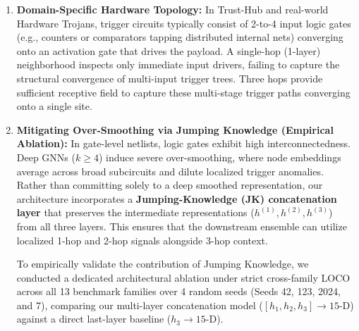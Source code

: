 \documentclass[11pt,a4paper]{article}
\begin{document}
\begin{enumerate}[leftmargin=*]
    \item \textbf{Domain-Specific Hardware Topology:} In Trust-Hub and real-world Hardware Trojans, trigger circuits typically consist of 2-to-4 input logic gates (e.g., counters or comparators tapping distributed internal nets) converging onto an activation gate that drives the payload. A single-hop (1-layer) neighborhood inspects only immediate input drivers, failing to capture the structural convergence of multi-input trigger trees. Three hops provide sufficient receptive field to capture these multi-stage trigger paths converging onto a single site.

    \item \textbf{Mitigating Over-Smoothing via Jumping Knowledge (Empirical Ablation):} In gate-level netlists, logic gates exhibit high interconnectedness. Deep GNNs ($k \ge 4$) induce severe over-smoothing, where node embeddings average across broad subcircuits and dilute localized trigger anomalies. Rather than committing solely to a deep smoothed representation, our architecture incorporates a \textbf{Jumping-Knowledge (JK) concatenation layer} that preserves the intermediate representations ($h^{(1)}, h^{(2)}, h^{(3)}$) from all three layers. This ensures that the downstream ensemble can utilize localized 1-hop and 2-hop signals alongside 3-hop context.

    To empirically validate the contribution of Jumping Knowledge, we conducted a dedicated architectural ablation under strict cross-family LOCO across all 13 benchmark families over 4 random seeds (Seeds 42, 123, 2024, and 7), comparing our multi-layer concatenation model ($[h_1, h_2, h_3] \to \text{15-D}$) against a direct last-layer baseline ($h_3 \to \text{15-D}$).


\end{enumerate}
\end{document}
